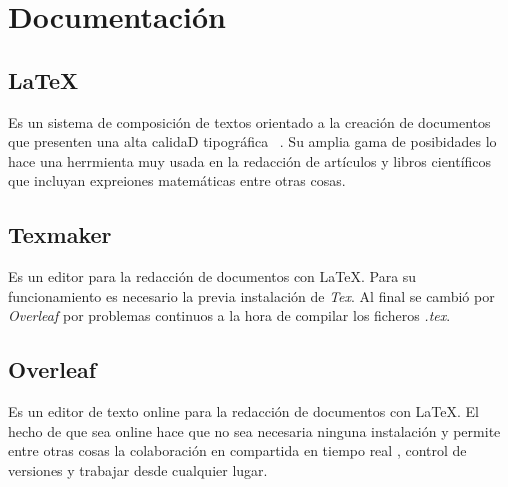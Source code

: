 \section{Documentación}
\subsection{\LaTeX}
Es un sistema de composición de textos orientado a la creación de documentos que presenten una alta calidaD tipográfica ~\cite{wiki:latex}. Su amplia gama de posibidades lo hace una herrmienta muy usada en la redacción de artículos y libros científicos que incluyan expreiones matemáticas entre otras cosas.
\subsection{Texmaker}
Es un editor para la redacción de documentos con \LaTeX. Para su funcionamiento es necesario la previa instalación de \emph{Tex}. Al final se cambió por \emph{Overleaf} por problemas continuos a la hora de compilar los ficheros \emph{.tex}.
\subsection{Overleaf}
Es un editor de texto online para la redacción de documentos con \LaTeX. El hecho de que sea online hace que no sea necesaria ninguna instalación y permite entre otras cosas la colaboración en compartida en tiempo real , control de versiones y trabajar desde cualquier lugar.